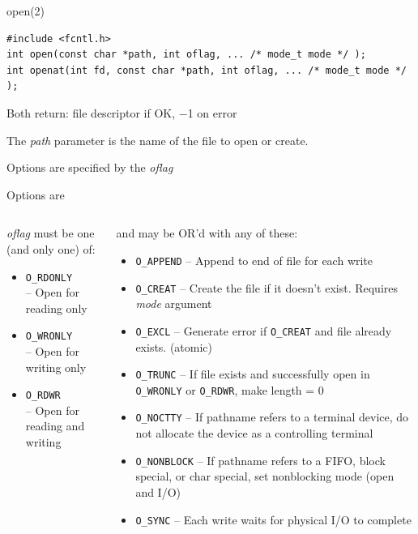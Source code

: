 \documentclass[newPxFont,sthlmFooter,nooffset]{beamer}
\begin{document}
\begin{frame}[containsverbatim,t]{open(2)}

\begin{lstlisting}[frame=single,numbers=none, xrightmargin=8pt]
#include <fcntl.h>
int open(const char *path, int oflag, ... /* mode_t mode */ );
int openat(int fd, const char *path, int oflag, ... /* mode_t mode */ );
\end{lstlisting}
Both return: file descriptor if OK, −1 on error
\bigskip

The \textit{path} parameter is the name of the file to open or create.
\bigskip

Options are specified by the \textit{oflag}
\end{frame}

\begin{frame}[t]{Options are}
\begin{columns}[t]
\begin{column}{0.30\linewidth}
\small \textit{oflag} must be one (and only one) of:
\footnotesize
\begin{itemize}
	\item \texttt{O\_RDONLY}\\ -- Open for reading only
	\item \texttt{O\_WRONLY}\\ -- Open for writing only
	\item \texttt{O\_RDWR}\\ -- Open for reading and writing
\end{itemize}
\end{column}
\begin{column}{0.70\linewidth}
\small and may be OR'd with any of these:
\footnotesize
\begin{itemize}
	\item \texttt{O\_APPEND} -- Append to end of file for each write
	\item \texttt{O\_CREAT} -- Create the file if it doesn't exist. Requires
		{\em mode} argument
	\item \texttt{O\_EXCL} -- Generate error if \texttt{O\_CREAT} and file
		already exists. (atomic)
	\item \texttt{O\_TRUNC} -- If file exists and successfully open in
		\texttt{O\_WRONLY} or \texttt{O\_RDWR}, make length = 0
	\item \texttt{O\_NOCTTY} -- If pathname refers to a terminal device, do
		not allocate the device as a controlling terminal
	\item \texttt{O\_NONBLOCK} -- If pathname refers to a FIFO, block special,
		or char special, set nonblocking mode (open and I/O)
	\item \texttt{O\_SYNC} --  Each write waits for physical I/O to complete
\end{itemize}
\end{column}
\end{columns}
\end{frame}
\end{document}
